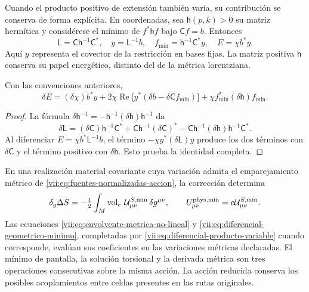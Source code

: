 Cuando el producto positivo de extensión también varía, su
contribución se conserva de forma explícita. En coordenadas, sea
\(\mathsf h(p,k)>0\) su matriz hermítica y considérese el mínimo
de \(f^*\mathsf h f\) bajo \(\mathsf C f=b\). Entonces
\begin{equation}
 \mathsf L=\mathsf C\mathsf h^{-1}\mathsf C^*,\quad
 y=\mathsf L^{-1}b,\quad
 f_{\min}=\mathsf h^{-1}\mathsf C^*y,\quad
 E=\chi b^*y.
 \label{vii:eq:minimo-producto-variable}
\end{equation}
Aquí \(y\) representa el covector de la restricción en bases
fijas. La matriz positiva \(\mathsf h\) conserva su papel
energético, distinto del de la métrica lorentziana.

\begin{lemma}
\label{vii:lem:producto-variable-extension}
Con las convenciones anteriores,
\begin{equation}
 \delta E=(\delta\chi)b^*y
   +2\chi\operatorname{Re}\bigl[y^*(\delta b-\delta\mathsf C f_{\min})\bigr]
   +\chi f_{\min}^*(\delta\mathsf h)f_{\min}.
 \label{vii:eq:diferencial-producto-variable}
\end{equation}
\end{lemma}
\begin{proof}
La fórmula \(\delta\mathsf h^{-1}
=-\mathsf h^{-1}(\delta\mathsf h)\mathsf h^{-1}\) da
\[
 \delta\mathsf L=(\delta\mathsf C)\mathsf h^{-1}\mathsf C^*
 +\mathsf C\mathsf h^{-1}(\delta\mathsf C)^*
 -\mathsf C\mathsf h^{-1}(\delta\mathsf h)
                              \mathsf h^{-1}\mathsf C^*.
\]
Al diferenciar \(E=\chi b^*\mathsf L^{-1}b\), el término
\(-\chi y^*(\delta\mathsf L)y\) produce los dos términos
con \(\delta\mathsf C\) y el término positivo con
\(\delta\mathsf h\). Esto prueba la identidad completa.
\end{proof}

En una realización material covariante cuya variación admita el
emparejamiento métrico de
\eqref{vii:eq:fuentes-normalizadas-accion}, la corrección determina
\begin{equation}
 \delta_g\Delta S
 =-\tfrac12\int_M\operatorname{vol}_e\,
          \mathcal U^{S,\min}_{\mu\nu}\,\delta g^{\mu\nu},
 \qquad U^{\rm phys,\min}_{\mu\nu}
                      =c\mathcal U^{S,\min}_{\mu\nu}.
 \label{vii:eq:fuente-metrica-minimo-no-lineal}
\end{equation}
Las ecuaciones \eqref{vii:eq:envolvente-metrica-no-lineal} y
\eqref{vii:eq:diferencial-geometrico-minimo}, completadas por
\eqref{vii:eq:diferencial-producto-variable} cuando corresponde,
evalúan sus coeficientes en las variaciones métricas declaradas.
El mínimo de pantalla, la solución torsional y la derivada métrica
son tres operaciones consecutivas sobre la misma acción.
La acción reducida conserva los posibles acoplamientos entre
celdas presentes en las rutas originales.

